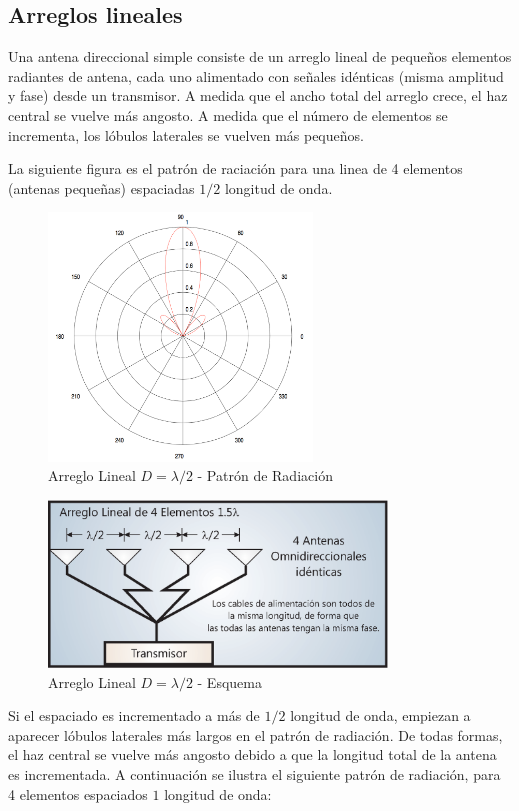 \subsection{Arreglos lineales}

Una antena direccional simple consiste de un arreglo lineal de pequeños elementos radiantes de antena, cada uno alimentado con señales idénticas (misma amplitud y fase) desde un transmisor. A medida que el ancho total del arreglo crece, el haz central se vuelve más angosto. A medida que el número de elementos se incrementa, los lóbulos laterales se vuelven más pequeños.

La siguiente figura es el patrón de raciación para una linea de 4 elementos (antenas pequeñas) espaciadas $1/2$ longitud de onda.

\begin{figure}[htb!]
        \centering
        \includegraphics[width=7cm]{./figures/C02-linear_array_1}
        \caption{Arreglo Lineal $D=\lambda/2$ - Patrón de Radiación}
        \label{fig:linear_array_1}
\end{figure}

\begin{figure}[htb!]
        \centering
        \includegraphics[width=9cm]{./figures/C02-linear_array_1_b}
        \caption{Arreglo Lineal $D=\lambda/2$ - Esquema}
        \label{fig:linear_array_1_b}
\end{figure}

Si el espaciado es incrementado a más de $1/2$ longitud de onda, empiezan a aparecer lóbulos laterales más largos en el patrón de radiación. De todas formas, el haz central se vuelve más angosto debido a que la longitud total de la antena es incrementada. A continuación se ilustra el siguiente patrón de radiación, para 4 elementos espaciados $1$ longitud de onda:

